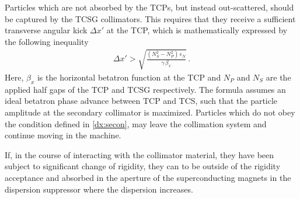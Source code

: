 Particles which are not absorbed by the TCPs, but instead out-scattered, should be captured by the TCSG collimators. This requires that they receive a sufficient transverse angular kick $\Delta x'$ at the TCP, which is mathematically expressed by the following inequality~\cite{ICOSIMref02}
%
\begin{align}
  \Delta x' > \sqrt{\frac{(N_S^2 - N_P^2) \, \epsilon_N }{ \gamma \, \beta_x } } \,. \label{dx:secon}
\end{align}
%
Here, $\beta_x$ is the horizontal betatron function at the TCP and $N_P$ and $N_S$ are the applied half gaps of the TCP and TCSG respectively. The formula assumes an ideal betatron phase advance between TCP and TCS, such that the particle amplitude at the secondary collimator is maximized. Particles which do not obey the condition defined in \eqref{dx:secon}, may leave the collimation system and continue moving in the machine.  

If, in the course of interacting with the collimator material, they have been subject to significant change of rigidity, they can to be outside of the rigidity acceptance and absorbed in the aperture of the superconducting magnets in the dispersion suppressor where the dispersion increases. 


